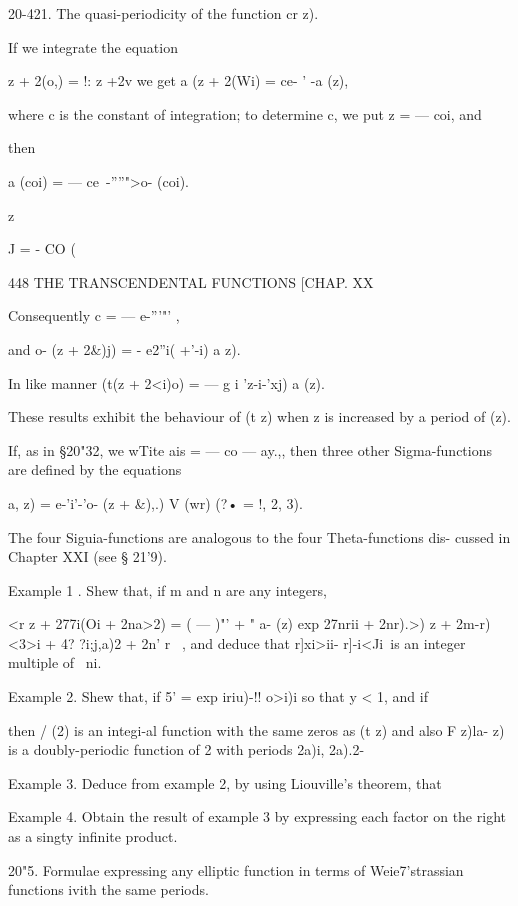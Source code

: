 {20-421. The quasi-periodicity of the function cr z). 

If we integrate the equation 

  z + 2(o,) = !: z +2v  
we get a (z + 2(Wi) = ce- ' -a (z), 

where c is the constant of integration; to determine c, we put z = — coi, and 

then 

a (coi) = — ce~-''''">o- (coi). 



z 

J  = - CO (\  



448 THE TRANSCENDENTAL FUNCTIONS [CHAP. XX 

Consequently c = — e-'''"' , 

and o- (z + 2\&)j) = - e2''i( +'-i) a  z). 

In like manner (t(z + 2<i)o) = — g i 'z-i-'xj) a (z). 

These results exhibit the behaviour of (t z) when z is increased by a 
period of   (z). 

If, as in §20"32, we wTite ais = — co  — ay.,, then three other Sigma-functions 
are defined by the equations 

a,  z) = e-'i'-'o- (z + \&),.) V (wr) (?• = !, 2, 3). 

The four Siguia-functions are analogous to the four Theta-functions dis- 
cussed in Chapter XXI (see § 21'9). 

Example 1 . Shew that, if m and n are any integers, 

<r z + 277i(Oi + 2na>2) = ( — )"' + " a- (z) exp   27nrii + 2nr).>) z + 2m-r) <3>i + 4? ?i;j,a)2 + 2n' r\ < ia>  , 
and deduce that r]xi>ii- r]-i<Ji\ is an integer multiple of \ ni. 

Example 2. Shew that, if 5' = exp  iriu)-!! o>i)i so that y < 1, and if 

then / (2) is an integi-al function with the same zeros as (t z) and also F z)la- z) is a 
doubly-periodic function of 2 with periods 2a)i, 2a).2- 

Example 3. Deduce from example 2, by using Liouville's theorem, that 

Example 4. Obtain the result of example 3 by expressing each factor on the right as 
a singty infinite product. 

20"5. Formulae expressing any elliptic function in terms of Weie7'strassian 
functions ivith the same periods. 

}
